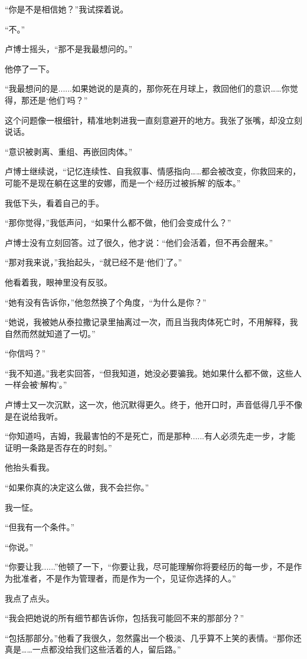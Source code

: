 “你是不是相信她？”我试探着说。

“不。”

卢博士摇头，“那不是我最想问的。”

他停了一下。

“我最想问的是......如果她说的是真的，那你死在月球上，救回他们的意识……你觉得，那还是‘他们’吗？”

这个问题像一根细针，精准地刺进我一直刻意避开的地方。我张了张嘴，却没立刻说话。

“意识被剥离、重组、再嵌回肉体。”

卢博士继续说，“记忆连续性、自我叙事、情感指向……都会被改变，你救回来的，可能不是现在躺在这里的安娜，而是一个‘经历过被拆解’的版本。”

我低下头，看着自己的手。

“那你觉得，”我低声问，“如果什么都不做，他们会变成什么？”

卢博士没有立刻回答。过了很久，他才说：“他们会活着，但不再会醒来。”

“那对我来说，”我抬起头，“就已经不是‘他们’了。”

他看着我，眼神里没有反驳。

“她有没有告诉你，”他忽然换了个角度，“为什么是你？”

“她说，我被她从泰拉撒记录里抽离过一次，而且当我肉体死亡时，不用解释，我自然而然就知道了一切。”

“你信吗？”

“我不知道。”我老实回答，“但我知道，她没必要骗我。她如果什么都不做，这些人一样会被‘解构’。”

卢博士又一次沉默，这一次，他沉默得更久。终于，他开口时，声音低得几乎不像是在说给我听。

“你知道吗，吉姆，我最害怕的不是死亡，而是那种......有人必须先走一步，才能证明一条路是否存在的时刻。”

他抬头看我。

“如果你真的决定这么做，我不会拦你。”

我一怔。

“但我有一个条件。”

“你说。”

“你要让我......”他顿了一下，“你要让我，尽可能理解你将要经历的每一步，不是作为批准者，不是作为管理者，而是作为一个，见证你选择的人。”

我点了点头。

“我会把她说的所有细节都告诉你，包括我可能回不来的那部分？”

“包括那部分。”他看了我很久，忽然露出一个极淡、几乎算不上笑的表情。“那你还真是……一点都没给我们这些活着的人，留后路。”

